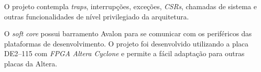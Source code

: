     {O projeto contempla \textit{traps}, interrupções, exceções, \textit{CSRs}, chamadas de sistema e outras funcionalidades de nível privilegiado da arquitetura.}

    {O \textit{soft core} possui barramento Avalon para se comunicar com os periféricos das plataformas de desenvolvimento. O projeto foi desenvolvido utilizando a placa DE2--115 com \textit{FPGA Altera Cyclone} e permite a fácil adaptação para outras placas da Altera.}
